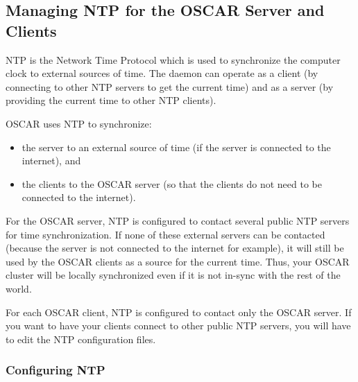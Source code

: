 %
%
% 
% 
% 
% 
%

\subsection{Managing NTP for the OSCAR Server and Clients}
\label{app:ntp-overview}

NTP is the Network Time Protocol which is used to synchronize the
computer clock to external sources of time.  The  daemon
can operate as a client (by connecting to other NTP servers to get the
current time) and as a server (by providing the current time to other
NTP clients).

\bigskip

OSCAR uses NTP to synchronize:
\begin{itemize}
\item the server to an external source of time (if the server is
  connected to the internet), and
\item the clients to the OSCAR server (so that the clients do not need
  to be connected to the internet).
\end{itemize}

For the OSCAR server, NTP is configured to contact several public NTP
servers for time synchronization.  If none of these external servers
can be contacted (because the server is not connected to the internet
for example), it will still be used by the OSCAR clients as a source
for the current time.  Thus, your OSCAR cluster will be locally
synchronized even if it is not in-sync with the rest of the world.

For each OSCAR client, NTP is configured to contact only the OSCAR
server.  If you want to have your clients connect to other public NTP
servers, you will have to edit the NTP configuration files.

\subsubsection{Configuring NTP}

